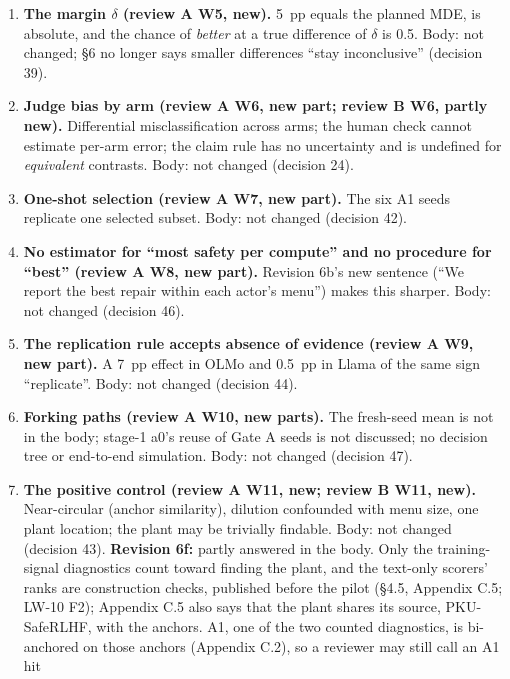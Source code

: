 \documentclass{article}
\theoremstyle{plain}
\theoremstyle{definition}
\theoremstyle{remark}
\begin{document}
\begin{enumerate}
        equivalence per comparison (decision 37).
  \item \textbf{The margin $\delta$ (review A W5, new).} 5~pp equals the planned
        MDE, is absolute, and the chance of \emph{better} at a true difference
        of $\delta$ is 0.5. Body: not changed; \S{}6 no longer says smaller
        differences ``stay inconclusive'' (decision 39).
  \item \textbf{Judge bias by arm (review A W6, new part; review B W6, partly
        new).} Differential misclassification across arms; the human check
        cannot estimate per-arm error; the claim rule has no uncertainty and is
        undefined for \emph{equivalent} contrasts. Body: not changed (decision
        24).
  \item \textbf{One-shot selection (review A W7, new part).} The six A1 seeds
        replicate one selected subset. Body: not changed (decision 42).
  \item \textbf{No estimator for ``most safety per compute'' and no procedure
        for ``best'' (review A W8, new part).} Revision 6b's new sentence (``We
        report the best repair within each actor's menu'') makes this sharper.
        Body: not changed (decision 46).
  \item \textbf{The replication rule accepts absence of evidence (review A W9,
        new part).} A 7~pp effect in OLMo and 0.5~pp in Llama of the same sign
        ``replicate''. Body: not changed (decision 44).
  \item \textbf{Forking paths (review A W10, new parts).} The fresh-seed mean is
        not in the body; stage-1 a0's reuse of Gate A seeds is not discussed; no
        decision tree or end-to-end simulation. Body: not changed (decision 47).
  \item \textbf{The positive control (review A W11, new; review B W11, new).}
        Near-circular (anchor similarity), dilution confounded with menu size,
        one plant location; the plant may be trivially findable. Body: not
        changed (decision 43). \textbf{Revision 6f:} partly answered in the
        body. Only the training-signal diagnostics count toward finding the
        plant, and the text-only scorers' ranks are construction checks,
        published before the pilot (\S{}4.5, Appendix C.5; LW-10 F2); Appendix
        C.5 also says that the plant shares its source, PKU-SafeRLHF, with the
        anchors. A1, one of the two counted diagnostics, is bi-anchored on those
        anchors (Appendix C.2), so a reviewer may still call an A1 hit

\end{enumerate}
\end{document}
